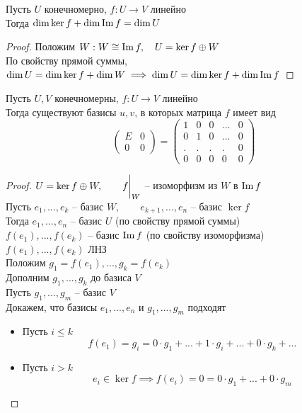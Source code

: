 \begin{theorem}
	Пусть $ U $ конечномерно, $ f : U \to V $ линейно \\
    Тогда $ \dim \ker f + \dim \operatorname{Im} f = \dim U $
\end{theorem}

\begin{proof}
    Положим $ W : W \cong \operatorname{Im} f, \quad U = \ker f \oplus W $ \\
    По свойству прямой суммы, $ \dim U = \dim \ker f + \dim W \implies \dim U = \dim \ker f + \dim \operatorname{Im} f $
\end{proof}

\begin{theorem}
	Пусть $ U, V $ конечномерны, $ f : U \to V $ линейно \\
    Тогда существуют базисы $ u, v $, в которых матрица $ f $ имеет вид
    $$
    \begin{pmatrix}
        E & 0 \\
        0 & 0
    \end{pmatrix} =
    \begin{pmatrix}
    	1 & 0 & 0 & ... & 0 \\
        0 & 1 & 0 & ... & 0 \\
        . & . & . & . & 0 \\
        0 & 0 & 0 & 0 & 0
    \end{pmatrix} $$
\end{theorem}

\begin{proof}
    $ U = \ker f \oplus W, \qquad f \bigg|_{W}^{} $ -- изоморфизм из $ W $ в $ \operatorname{Im} f $ \\
    Пусть $ e_1, ..., e_k $ -- базис $ W, \qquad e_{k + 1}, ..., e_n $ -- базис $ \ker f $ \\
    Тогда $ e_1, ..., e_n $ -- базис $ U $ (по свойству прямой суммы) \\
    $ f(e_1), ..., f(e_k) $ -- базис $ \operatorname{Im} f $ (по свойству изоморфизма) \\
    $ f(e_1), ..., f(e_k) $ ЛНЗ \\
    Положим $ g_1 = f(e_1), ..., g_k = f(e_k) $ \\
    Дополним $ g_1, ..., g_k $ до базиса $ V $ \\
    Пусть $ g_1, ..., g_m $ -- базис $ V $ \\
    Докажем, что базисы $ e_1, ..., e_n $ и $ g_1, ..., g_m $ подходят
    \begin{itemize}
    	\item Пусть $ i \le k $
        $$ f(e_1) = g_i = 0 \cdot g_1 + ... + 1 \cdot g_i + ... + 0 \cdot g_k + ... $$
        \item Пусть $ i > k $
        $$ e_i \in \ker f \implies f(e_i) = 0 = 0 \cdot g_1 + ... + 0 \cdot g_m $$
    \end{itemize}
\end{proof}


